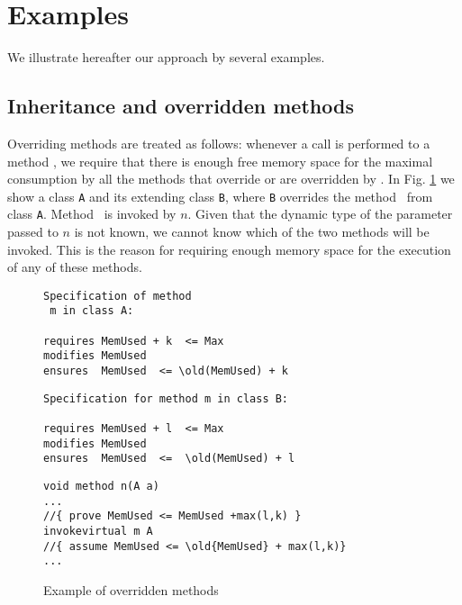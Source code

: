 
\section{Examples}\label{sec:examples}
We illustrate hereafter our approach by several examples. 

\subsection{Inheritance and overridden methods} Overriding methods are treated as follows: whenever a call is performed to a method \method,
we require that there is enough free memory space for the maximal
consumption by all the  methods that override or are overridden by
\method. In Fig. \ref{classExt} we show a class \verb!A! and its
extending class \verb!B!, where \verb!B! overrides the method \method\ from class \verb!A!. Method \method\ is invoked by $n$. Given that the dynamic type of the parameter passed to $n$ is not known, we cannot know which of the two
methods will be invoked. This is the reason for requiring enough memory space for the execution of any of these methods.

\begin{figure}[!htp]
\begin{frameit}
\begin{center}
\begin{minipage}[c]{\linewidth}%
\begin{lstlisting}[frame=trbl]
Specification of method
 m in class A:

requires MemUsed + k  <= Max 
modifies MemUsed 
ensures  MemUsed  <= \old(MemUsed) + k
\end{lstlisting}

\begin{lstlisting}[frame=trbl]
Specification for method m in class B:

requires MemUsed + l  <= Max 
modifies MemUsed 
ensures  MemUsed  <=  \old(MemUsed) + l
\end{lstlisting}

\end{minipage}

\begin{minipage}[c]{\linewidth} %
\begin{lstlisting}[frame=trbl]
void method n(A a)
...
//{ prove MemUsed <= MemUsed +max(l,k) }
invokevirtual m A
//{ assume MemUsed <= \old{MemUsed} + max(l,k)}
...
\end{lstlisting}
\end{minipage}

\caption{\sc Example of overridden methods}
\label{classExt}
\end{center}
\end{frameit}
\end{figure}


